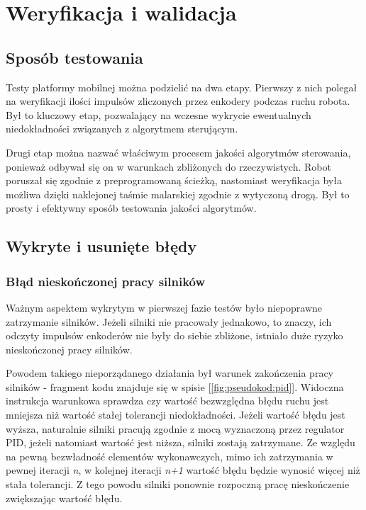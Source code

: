 \chapter{Weryfikacja i walidacja}
\label{ch:07}

\section{Sposób testowania}

Testy platformy mobilnej można podzielić na dwa etapy. Pierwszy z nich polegał na weryfikacji ilości impulsów zliczonych przez enkodery podczas ruchu robota. Był to kluczowy etap, pozwalający na wczesne wykrycie ewentualnych niedokładności związanych z algorytmem sterującym. 

Drugi etap można nazwać właściwym procesem jakości algorytmów sterowania, ponieważ odbywał się on w warunkach zbliżonych do rzeczywistych. Robot poruszał się zgodnie z preprogramowaną ścieżką, nastomiast weryfikacja była możliwa dzięki naklejonej taśmie malarskiej zgodnie z wytyczoną drogą. Był to prosty i efektywny sposób testowania jakości algorytmów. 


\section{Wykryte i usunięte błędy}


\subsection{Błąd nieskończonej pracy silników}
Ważnym aspektem wykrytym w pierwszej fazie testów było niepoprawne zatrzymanie silników. Jeżeli silniki nie pracowały jednakowo, to znaczy, ich odczyty impulsów enkoderów nie były do siebie zbliżone, istniało duże ryzyko nieskończonej pracy silników. 

Powodem takiego nieporządanego działania był warunek zakończenia pracy silników - fragment kodu znajduje się w spisie [\ref{fig:pseudokod:pid}]. Widoczna instrukcja warunkowa sprawdza czy wartość bezwzględna błędu ruchu jest mniejsza niż wartość stałej tolerancji niedokładności. Jeżeli wartość błędu jest wyższa, naturalnie silniki pracują zgodnie z mocą wyznaczoną przez regulator PID, jeżeli natomiast wartość jest niższa, silniki zostają zatrzymane. Ze względu na pewną bezwładność elementów wykonawczych, mimo ich zatrzymania w pewnej iteracji \textit{n}, w kolejnej iteracji \textit{n+1} wartość błędu będzie wynosić więcej niż stała tolerancji. Z tego powodu silniki ponownie rozpoczną pracę nieskończenie zwiększając wartość błędu. 

